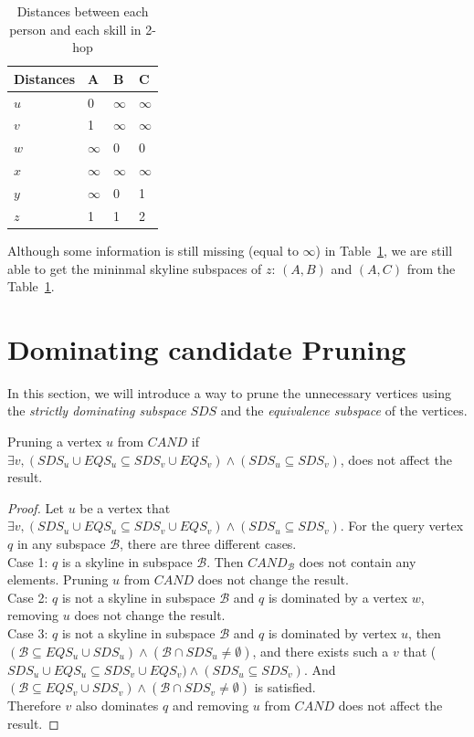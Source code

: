 \begin{table}[h]
    \centering
    \begin{tabular}{llll}
    \hline
    Distances & A & B & C \\ \hline
    $u$       & 0 & $\infty$ & $\infty$ \\ \hline
    $v$       & 1 & $\infty$ & $\infty$ \\ \hline
    $w$       & $\infty$ & 0 & 0 \\ \hline
    $x$       & $\infty$ & $\infty$ & $\infty$ \\ \hline
    $y$       & $\infty$ & 0 & 1 \\ \hline
    $z$       & 1 & 1 & 2 \\ \hline
    \end{tabular}
    \caption{Distances between each person and each skill in 2-hop}
    \label{tab:d_hops_distance}
\end{table}

Although some information is still missing (equal to $\infty$) in Table~\ref{tab:d_hops_distance}, we are still able to get the mininmal skyline subspaces of $z$: $(A, B)$ and $(A, C)$ from the Table~\ref{tab:d_hops_distance}.

\section{Dominating candidate Pruning}

In this section, we will introduce a way to prune the unnecessary vertices using the \emph{strictly dominating subspace} $SDS$ and the \emph{equivalence subspace} of the vertices.

\begin{property}
\label{ppt:prune_cand}
Pruning a vertex $u$ from $\mathit{CAND}$ if $\exists v, (SDS_u \cup EQS_u \subseteq SDS_v \cup EQS_v) \wedge (SDS_u \subseteq SDS_v)$, does not affect the result.
\end{property}

\begin{proof}
Let $u$ be a vertex that $\exists v, (SDS_u \cup EQS_u \subseteq SDS_v \cup EQS_v) \wedge (SDS_u \subseteq SDS_v)$. For the query vertex $q$ in any subspace $\mathcal{B}$, there are three different cases.\\
Case 1: $q$ is a skyline in subspace $\mathcal{B}$. Then $\mathit{CAND}_\mathcal{B}$ does not contain any elements. Pruning $u$ from $\mathit{CAND}$ does not change the result.\\
Case 2: $q$ is not a skyline in subspace $\mathcal{B}$ and $q$ is dominated by a vertex $w$, removing $u$ does not change the result.\\
Case 3: $q$ is not a skyline in subspace $\mathcal{B}$ and $q$ is dominated by vertex $u$, then $(\mathcal{B} \subseteq EQS_u \cup SDS_u) \wedge (\mathcal{B} \cap SDS_u \not= \emptyset)$, and there exists such a $v$ that ($SDS_u \cup EQS_u \subseteq SDS_v \cup EQS_v) \wedge (SDS_u \subseteq SDS_v)$. And $(\mathcal{B} \subseteq EQS_v \cup SDS_v) \wedge (\mathcal{B} \cap SDS_v \not= \emptyset)$ is satisfied.\\
Therefore $v$ also dominates $q$ and removing $u$ from $CAND$ does not affect the result.
\end{proof}

